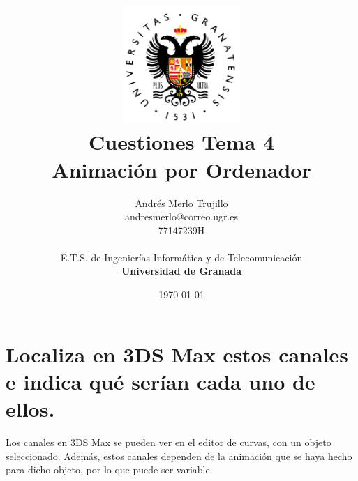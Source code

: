 \documentclass[draft]{article}
\title{
\includegraphics[width=1.75in]{imagenes/UGR-Logo.png} \\
\vspace*{1in}
\textbf{Cuestiones Tema 4} \\
Animación por Ordenador \\
\vspace*{0.5in}}
\author{Andrés Merlo Trujillo \\
andresmerlo@correo.ugr.es \\
77147239H \\ 
\vspace*{0.5in} \\
E.T.S. de Ingenierías Informática y de Telecomunicación \\
\textbf{Universidad de Granada}} \date{\today}
\begin{document}
\begin{titlingpage}
\maketitle
\end{titlingpage}

\tableofcontents

\newpage

\pagestyle{fancy}   %



\section{Localiza en 3DS Max estos canales e indica qué serían cada uno de ellos.}

Los canales en 3DS Max se pueden ver en el editor de curvas, con un objeto seleccionado. Además, estos canales dependen de la animación que se haya hecho para dicho objeto, por lo que puede ser variable. 
\end{document}
